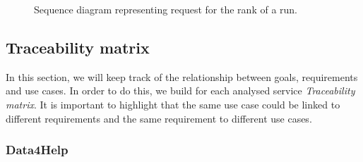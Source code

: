             \begin{figure}[H]
                \centering
                \caption{Sequence diagram representing request for the rank of a run.}
                \label{fig:T4R-rank-history}
            \end{figure}
            
    \subsection{Traceability matrix}
    
    In this section, we will keep track of the relationship between goals, requirements and use cases. In order to do this, we build for each analysed service \emph{Traceability matrix}. It is important to highlight that the same use case could be linked to different requirements and the same requirement to different use cases. 
    
        \subsubsection{Data4Help}
        
